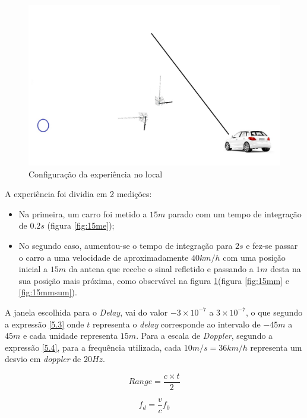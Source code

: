 \begin{figure}[h]
\centering
\includegraphics[scale=0.3]{chapters/ch5/assets/geoexp}
\caption[Configuração da experiência]{Configuração da experiência no local}
\label{fig:geoexp}
\end{figure}

A experiência foi dividia em 2 medições:
\begin{itemize}
\item Na primeira, um carro foi metido a $1 5m$ parado com um tempo de integração de $0.2 s$ (figura \ref{fig:15me});
\item No segundo caso, aumentou-se o tempo de integração para $2 s$ e fez-se passar o carro a uma velocidade de aproximadamente $40 km/h$ com uma posição inicial a $15m$ da antena que recebe o sinal refletido e passando a 
$1 m$ desta na sua posição mais próxima, como observável na figura \ref{fig:geoexp}(figura \ref{fig:15mm} e \ref{fig:15mmsum}). 
\end{itemize}

A janela escolhida para o \textit{Delay}, vai do valor $-3\times 10^{-7}$ a $3\times 10^{-7}$, o que segundo a expressão \ref{5.3} onde $t$ representa o \textit{delay} corresponde ao intervalo de $-45 m$ a $45 m$ e cada unidade representa $15 m$. Para a escala de \textit{Doppler}, segundo a expressão \ref{5.4}, para a frequência utilizada, cada $10 m/s = 36 km/h$ representa um desvio em \textit{doppler} de $20 Hz$.

\begin{equation} \label{5.3}
Range = \dfrac{c\times t}{2}
\end{equation}

\begin{equation} \label{5.4}
f_{d} = \dfrac{v}{c}f_{0}
\end{equation}

